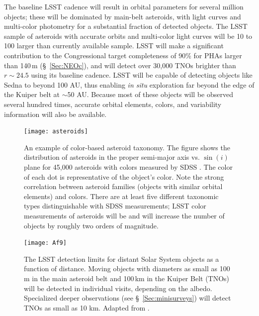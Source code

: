 The baseline LSST cadence will result in orbital parameters for several
million objects; these will be dominated by main-belt asteroids, with
light curves and multi-color photometry for a substantial fraction of detected objects.
The LSST sample of asteroids with accurate orbits and multi-color light curves
will be 10 to 100 larger than currently available sample.
LSST will make a significant contribution to the Congressional target
completeness of 90\% for PHAs larger than 140\,m (\S~\ref{Sec:NEOc}), and will detect over 30,000 TNOs brighter than $r\sim24.5$ using its baseline cadence. LSST will be capable
of detecting objects like Sedna to beyond 100 AU, thus enabling \textit{in situ} exploration
far beyond the edge of the Kuiper belt at $\sim$50 AU. Because most of these
objects will be observed several hundred times, accurate orbital elements,
colors, and variability information will also be available.


\begin{figure}
\texttt{[image: asteroids]}
\caption{An example of color-based asteroid taxonomy. The figure
shows the distribution of asteroids in the proper semi-major axis vs. $\sin(i)$
plane for 45,000 asteroids with colors measured by SDSS \citep{2008Icar..198..138P}.
The color of each dot is representative of the object's color.
Note the strong correlation between asteroid families (objects with
similar orbital elements) and colors. There are
at least five different taxonomic types distinguishable with SDSS measurements;
LSST color measurements of asteroids will be
and will increase the number of objects by roughly two orders of magnitude.}
\label{Fig:asteroids}
\end{figure}

\begin{figure}
\texttt{[image: Af9]}
\caption{The LSST detection limits for distant Solar System objects as
  a function of distance.
Moving objects with diameters as small as 100\,m in the main asteroid belt and
100\,km in the Kuiper Belt (TNOs) will be detected in individual visits,
depending on the albedo. Specialized deeper observations
(see \S~\ref{Sec:minisurveys}) will detect TNOs as small as 10 km. Adapted from
\citet{2007AAS...21113714J}.}
\label{Fig:Af9}
\end{figure}



